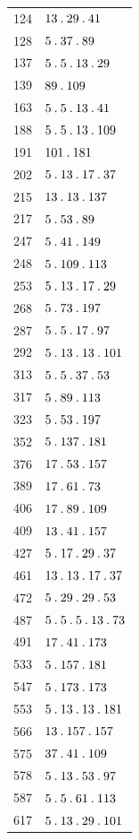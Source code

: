 \begin{longtable}{@{}r|l@{}}
124 & $13\mathbin{.} 29\mathbin{.} 41$\\
128 & $5\mathbin{.} 37\mathbin{.} 89$\\
137 & $5\mathbin{.} 5\mathbin{.} 13\mathbin{.} 29$\\
139 & $89\mathbin{.} 109$\\
163 & $5\mathbin{.} 5\mathbin{.} 13\mathbin{.} 41$\\
188 & $5\mathbin{.} 5\mathbin{.} 13\mathbin{.} 109$\\
191 & $101\mathbin{.} 181$\\
202 & $5\mathbin{.} 13\mathbin{.} 17\mathbin{.} 37$\\
215 & $13\mathbin{.} 13\mathbin{.} 137$\\
217 & $5\mathbin{.} 53\mathbin{.} 89$\\
247 & $5\mathbin{.} 41\mathbin{.} 149$\\
248 & $5\mathbin{.} 109\mathbin{.} 113$\\
253 & $5\mathbin{.} 13\mathbin{.} 17\mathbin{.} 29$\\
268 & $5\mathbin{.} 73\mathbin{.} 197$\\
287 & $5\mathbin{.} 5\mathbin{.} 17\mathbin{.} 97$\\
292 & $5\mathbin{.} 13\mathbin{.} 13\mathbin{.} 101$\\
313 & $5\mathbin{.} 5\mathbin{.} 37\mathbin{.} 53$\\
317 & $5\mathbin{.} 89\mathbin{.} 113$\\
323 & $5\mathbin{.} 53\mathbin{.} 197$\\
352 & $5\mathbin{.} 137\mathbin{.} 181$\\
376 & $17\mathbin{.} 53\mathbin{.} 157$\\
389 & $17\mathbin{.} 61\mathbin{.} 73$\\
406 & $17\mathbin{.} 89\mathbin{.} 109$\\
409 & $13\mathbin{.} 41\mathbin{.} 157$\\
427 & $5\mathbin{.} 17\mathbin{.} 29\mathbin{.} 37$\\
461 & $13\mathbin{.} 13\mathbin{.} 17\mathbin{.} 37$\\
472 & $5\mathbin{.} 29\mathbin{.} 29\mathbin{.} 53$\\
487 & $5\mathbin{.} 5\mathbin{.} 5\mathbin{.} 13\mathbin{.} 73$\\
491 & $17\mathbin{.} 41\mathbin{.} 173$\\
533 & $5\mathbin{.} 157\mathbin{.} 181$\\
547 & $5\mathbin{.} 173\mathbin{.} 173$\\
553 & $5\mathbin{.} 13\mathbin{.} 13\mathbin{.} 181$\\
566 & $13\mathbin{.} 157\mathbin{.} 157$\\
575 & $37\mathbin{.} 41\mathbin{.} 109$\\
578 & $5\mathbin{.} 13\mathbin{.} 53\mathbin{.} 97$\\
587 & $5\mathbin{.} 5\mathbin{.} 61\mathbin{.} 113$\\
617 & $5\mathbin{.} 13\mathbin{.} 29\mathbin{.} 101$\\

\end{longtable}
